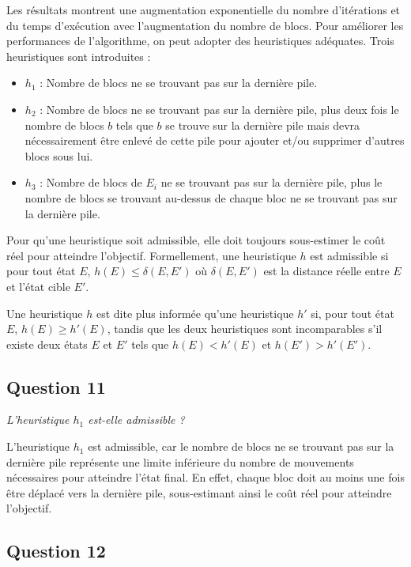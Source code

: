 Les résultats montrent une augmentation exponentielle du nombre d'itérations et du temps d'exécution avec l'augmentation du nombre de blocs. Pour améliorer les performances de l'algorithme, on peut adopter des heuristiques adéquates. Trois heuristiques sont introduites :

\begin{itemize}
    \item $h_1$ : Nombre de blocs ne se trouvant pas sur la dernière pile.
    \item $h_2$ : Nombre de blocs ne se trouvant pas sur la dernière pile, plus deux fois le nombre de blocs $b$ tels que $b$ se trouve sur la dernière pile mais devra nécessairement être enlevé de cette pile pour ajouter et/ou supprimer d'autres blocs sous lui.
    \item $h_3$ : Nombre de blocs de $E_i$ ne se trouvant pas sur la dernière pile, plus le nombre de blocs se trouvant au-dessus de chaque bloc ne se trouvant pas sur la dernière pile.
\end{itemize}

Pour qu'une heuristique soit admissible, elle doit toujours sous-estimer le coût réel pour atteindre l'objectif. Formellement, une heuristique $h$ est admissible si pour tout état $E$, $h(E) \leq \delta (E, E')$ où $\delta (E, E')$ est la distance réelle entre $E$ et l'état cible $E'$.

Une heuristique $h$ est dite plus informée qu'une heuristique $h'$ si, pour tout état $E$, $h(E) \geq h'(E)$, tandis que les deux heuristiques sont incomparables s'il existe deux états $E$ et $E'$ tels que $h(E) < h'(E)$ et $h(E') > h'(E')$.

\subsection{Question 11}

\textit{L'heuristique $h_1$ est-elle admissible ?}

L'heuristique $h_1$ est admissible, car le nombre de blocs ne se trouvant pas sur la dernière pile représente une limite inférieure du nombre de mouvements nécessaires pour atteindre l'état final. En effet, chaque bloc doit au moins une fois être déplacé vers la dernière pile, sous-estimant ainsi le coût réel pour atteindre l'objectif.

\subsection{Question 12}

